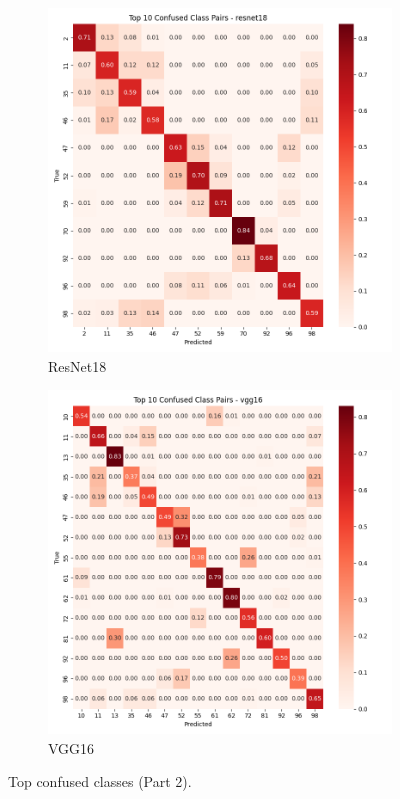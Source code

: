 \documentclass[11pt]{article}
\begin{document}
\begin{figure}[htbp]
\vspace{0.2cm}

\begin{subfigure}[b]{0.48\textwidth}
\includegraphics[width=\textwidth]{confusion_matrix_resnet18_top_confused.png}
\caption{ResNet18}
\end{subfigure}
\hfill
\begin{subfigure}[b]{0.48\textwidth}
\includegraphics[width=\textwidth]{confusion_matrix_vgg16_top_confused.png}
\caption{VGG16}
\end{subfigure}

\caption{Top confused classes (Part 2).}
\label{fig:top_confused_part2}
\end{figure}
\end{document}
